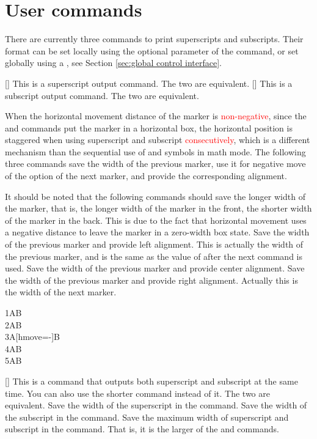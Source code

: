 \documentclass[load-preamble+]{cnltx-doc}
\renewcommand{\emph}[1]{\textcolor{red}{#1}}
\begin{document}
\section{User commands}
\label{sec:user commands}
There are currently three commands to print superscripts and subscripts. Their format can be set locally using the optional parameter of the command, or set globally using a , see Section \ref{sec:global control interface}.
\begin{commands}
  [\sarg{}]
  This is a superscript output command. The two  are equivalent.
  [\sarg{}]
  This is a subscript output command. The two  are equivalent.

  When the horizontal movement distance of the marker is \emph{non-negative}, since the  and  commands put the marker in a horizontal box, the horizontal position is staggered when using superscript and subscript \emph{consecutively}, which is a different mechanism than the sequential use of \code{\^{}} and \code{\_{}} symbols in math mode. The following three commands save the width of the previous marker, use it for negative move of the  option of the next marker, and provide the corresponding alignment.

  It should be noted that the following commands should save the longer width of the marker, that is, the longer width of the marker in the front, the shorter width of the marker in the back. This is due to the fact that horizontal movement uses a negative distance to leave the marker in a zero-width box state.
  Save the width of the previous marker and provide left alignment. This is actually the width of the previous marker, and is the same as the value of  after the next command is used.
  Save the width of the previous marker and provide center alignment. 
  Save the width of the previous marker and provide right alignment. Actually this is the width of the next marker.
\begin{demohigh}
1AB \\
2AB \\
3A[hmove=-\llastwd]B \\
4AB \\
5AB
\end{demohigh}
  [\sarg{}]
  This is a command that outputs both superscript and subscript at the same time. You can also use the shorter command  instead of it. The two  are equivalent.
  Save the width of the superscript in the  command.
  Save the width of the subscript in the  command.
  Save the maximum width of superscript and subscript in the  command. That is, it is the larger of the  and  commands.


\end{commands}
\end{document}
